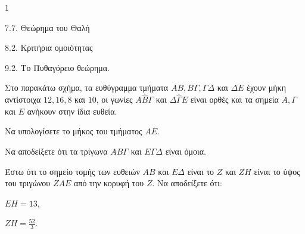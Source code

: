 \begin{ylh}{1}
    \item 7.7. Θεώρημα του Θαλή
    \item 8.2. Κριτήρια ομοιότητας
    \item 9.2. Το Πυθαγόρειο θεώρημα.
\end{ylh}
\begin{figure}
\centering
{}
\end{figure}
Στο παρακάτω σχήμα, τα ευθύγραμμα τμήματα $AB, B\Gamma, \Gamma\Delta$ και $\Delta E$ έχουν μήκη αντίστοιχα $12, 16, 8$ και $10$, οι γωνίες $A\hat{B}\Gamma$ και $\Delta\hat{\Gamma}E$ είναι ορθές και τα σημεία $A,\Gamma$ και $E$ ανήκουν στην ίδια ευθεία.
\begin{alist}
\item Να υπολογίσετε το μήκος του τμήματος $AE$. 
\item Να αποδείξετε ότι τα τρίγωνα $AB\Gamma$ και $E\Gamma\Delta$ είναι όμοια. 
\item Έστω ότι το σημείο τομής των ευθειών $AB$ και $E\Delta$ είναι το $Z$ και $ZH$ είναι το ύψος του τριγώνου $ZAE$ από την κορυφή του $Z$. Να αποδείξετε ότι:
  \begin{rlist}
  \item $EH = 13$, 
  \item $ZH = \frac{52}{3}$. 
  \end{rlist}
\end{alist}